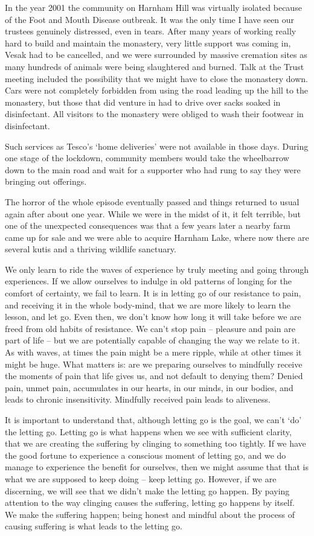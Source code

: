 In the year 2001 the community on Harnham Hill was virtually isolated
because of the Foot and Mouth Disease\cite{foot}
outbreak. It was the only time I have seen our
trustees genuinely distressed, even in tears. After many years of
working really hard to build and maintain the monastery, very little
support was coming in, Vesak had to be cancelled, and we were surrounded
by massive cremation sites as many hundreds of animals were being
slaughtered and burned. Talk at the Trust meeting included the
possibility that we might have to close the monastery down. Cars were
not completely forbidden from using the road leading up the hill to the
monastery, but those that did venture in had to drive over sacks soaked
in disinfectant. All visitors to the monastery were obliged to wash
their footwear in disinfectant.

Such services as Tesco's `home deliveries' were not available in those
days. During one stage of the lockdown, community members would take the
wheelbarrow down to the main road and wait for a supporter who had rung
to say they were bringing out offerings.

The horror of the whole episode eventually passed and things returned to
usual again after about one year. While we were in the midst of it, it
felt terrible, but one of the unexpected consequences was that a few
years later a nearby farm came up for sale and we were able to acquire
Harnham Lake, where now there are several kutis and a thriving wildlife
sanctuary.

We only learn to ride the waves of experience by truly meeting and going
through experiences. If we allow ourselves to indulge in old patterns of
longing for the comfort of certainty, we fail to learn. It is in letting
go of our resistance to pain, and receiving it in the whole body-mind,
that we are more likely to learn the lesson, and let go. Even then, we
don't know how long it will take before we are freed from old habits of
resistance. We can't stop pain -- pleasure and pain are part of life --
but we are potentially capable of changing the way we relate to it. As
with waves, at times the pain might be a mere ripple, while at other
times it might be huge. What matters is: are we preparing ourselves to
mindfully receive the moments of pain that life gives us, and not
default to denying them? Denied pain, unmet pain, accumulates in
our hearts, in our minds, in our bodies, and leads to chronic
insensitivity. Mindfully received pain leads to aliveness.

It is important to understand that, although letting go is the goal, we
can't `do' the letting go. Letting go is what happens when we see with
sufficient clarity, that we are creating the suffering by clinging to
something too tightly. If we have the good fortune to experience a
conscious moment of letting go, and we do manage to experience the
benefit for ourselves, then we might assume that that is what we are
supposed to keep doing -- keep letting go. However, if we are
discerning, we will see that we didn't make the letting go happen. By
paying attention to the way clinging causes the suffering, letting go
happens by itself. We make the suffering happen; being honest and
mindful about the process of causing suffering is what leads to the
letting go.

